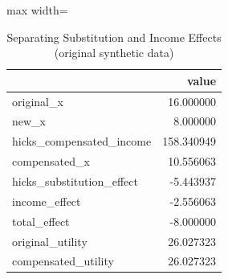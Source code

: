 \begin{table}[htbp]
\centering
\caption{Separating Substitution and Income Effects (original synthetic data)}
\begingroup
\small
\setlength{\tabcolsep}{6pt}
\renewcommand{\arraystretch}{1.12}
\begin{adjustbox}{max width=\linewidth}
\begin{tabular}{@{}lr@{}}
\toprule
 & value \\
\midrule
original\_x & 16.000000 \\
new\_x & 8.000000 \\
hicks\_compensated\_income & 158.340949 \\
compensated\_x & 10.556063 \\
hicks\_substitution\_effect & -5.443937 \\
income\_effect & -2.556063 \\
total\_effect & -8.000000 \\
original\_utility & 26.027323 \\
compensated\_utility & 26.027323 \\
\bottomrule
\end{tabular}
\end{adjustbox}
\endgroup
\end{table}